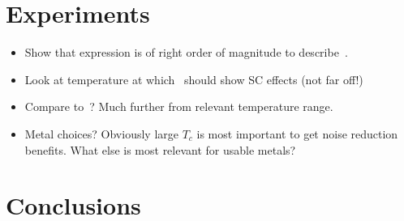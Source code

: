 \documentclass{article}
\begin{document}
\section{Experiments \label{sec:experiments}}
\begin{itemize}
	\item Show that expression is of right order of magnitude to describe~\cite{Tenberg2019}.
	\item Look at temperature at which~\cite{Tenberg2019} should show SC effects (not far off!)
	\item Compare to~\cite{Kolkowitz2015}?
	Much further from relevant temperature range.
	\item Metal choices?
	Obviously large $T_c$ is most important to get noise reduction benefits.
	What else is most relevant for usable metals?
\end{itemize}
\section{Conclusions \label{sec:conclusions}}

\printbibliography
\end{document}
